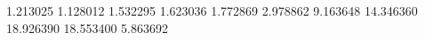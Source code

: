 1.213025
1.128012
1.532295
1.623036
1.772869
2.978862
9.163648
14.346360
18.926390
18.553400
5.863692
